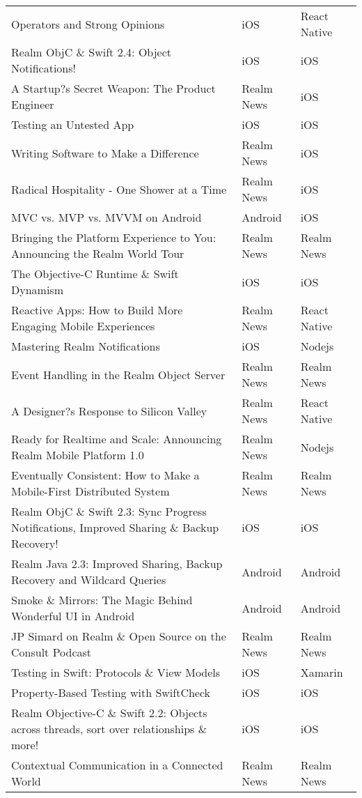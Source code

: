 \documentclass[letterpaper,11pt]{article}
\begin{document}
\begin{table}[h]
\begin{adjustbox}{max width=\linewidth}
\begin{tabular}{ | l | l | l |}
Operators and Strong Opinions & iOS & React Native \\ 
Realm ObjC \& Swift 2.4: Object Notifications! & iOS & iOS \\ 
A Startup?s Secret Weapon: The Product Engineer & Realm News & iOS \\ 
Testing an Untested App & iOS & iOS \\ 
Writing Software to Make a Difference & Realm News & iOS \\ 
Radical Hospitality - One Shower at a Time & Realm News & iOS \\ 
MVC vs. MVP vs. MVVM on Android & Android & iOS \\ 
Bringing the Platform Experience to You: Announcing the Realm World Tour & Realm News & Realm News \\ 
The Objective-C Runtime \& Swift Dynamism & iOS & iOS \\ 
Reactive Apps: How to Build More Engaging Mobile Experiences & Realm News & React Native \\ 
Mastering Realm Notifications & iOS & Nodejs \\ 
Event Handling in the Realm Object Server & Realm News & Realm News \\ 
A Designer?s Response to Silicon Valley & Realm News & React Native \\ 
Ready for Realtime and Scale: Announcing Realm Mobile Platform 1.0 & Realm News & Nodejs \\ 
Eventually Consistent: How to Make a Mobile-First Distributed System & Realm News & Realm News \\ 
Realm ObjC \& Swift 2.3: Sync Progress Notifications, Improved Sharing \& Backup Recovery! & iOS & iOS \\ 
Realm Java 2.3: Improved Sharing, Backup Recovery and Wildcard Queries & Android & Android \\ 
Smoke \& Mirrors: The Magic Behind Wonderful UI in Android & Android & Android \\ 
JP Simard on Realm \& Open Source on the Consult Podcast & Realm News & Realm News \\ 
Testing in Swift: Protocols \& View Models & iOS & Xamarin \\ 
Property-Based Testing with SwiftCheck & iOS & iOS \\ 
Realm Objective-C \& Swift 2.2: Objects across threads, sort over relationships \& more! & iOS & iOS \\ 
Contextual Communication in a Connected World & Realm News & Realm News \\ 

\end{tabular}
\end{adjustbox}
\end{table}
\end{document}
